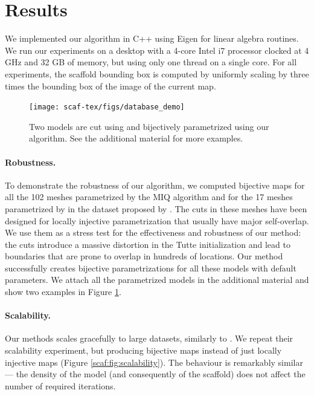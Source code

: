 \section{Results}
We implemented our algorithm in C++ using Eigen\cite{eigenweb} for linear algebra routines. We run our experiments on a desktop with a 4-core Intel i7  processor clocked at 4 GHz and 32 GB of memory, but using only one thread on a single core.
For all experiments, the scaffold bounding box is computed by uniformly scaling by three times the bounding box of the image of the current map. 

\begin{figure}[t]
\centering
\texttt{[image: scaf-tex/figs/database\_demo]}
\caption{Two models are cut using \cite{Bommes:2009} and bijectively parametrized using our algorithm. See the additional material for more examples.}
\label{scaf:fig:miq_database}
\vspace{-0.2cm}
\end{figure}

\paragraph{Robustness.} To demonstrate the robustness of our algorithm, we computed  bijective maps for all the 102 meshes parametrized by the MIQ algorithm \cite{Bommes:2009} and for the 17 meshes parametrized by  \cite{Myles:2014} in the dataset proposed by \cite{Myles:2014}. The cuts in these meshes have been designed for locally injective parametrization that usually have major self-overlap. We use them as a stress test for the effectiveness and robustness of our method:  the cuts introduce a massive distortion in the Tutte initialization and lead to boundaries that are prone to overlap in hundreds of locations. Our method successfully creates bijective parametrizations for all these models with default parameters. We attach all the parametrized models in the additional material and show two examples in Figure \ref{scaf:fig:miq_database}. 


\paragraph{Scalability.} Our methods scales gracefully to large datasets, similarly to \cite{rabinovich2017scalable}. We repeat their scalability experiment, but producing bijective maps instead of just locally injective maps (Figure \ref{scaf:fig:scalability}). The behaviour is remarkably similar --- the density of the model (and consequently of the scaffold) does not affect the number of required iterations. 

